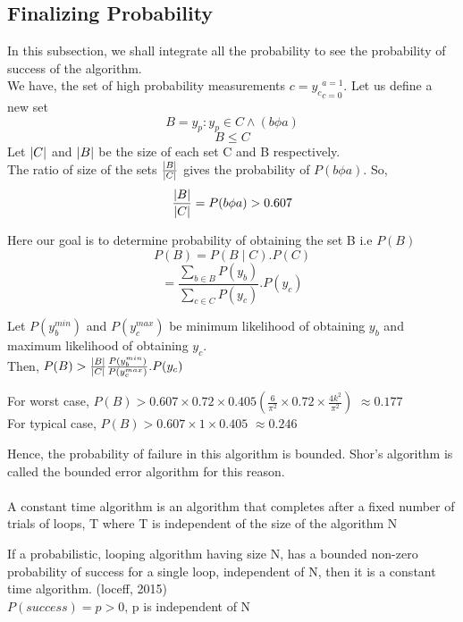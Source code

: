 \subsection{Finalizing Probability}
In this subsection, we shall integrate all the probability to see the probability of success of the algorithm. 
\\We have, the set of high probability measurements $c={y_c}_{c=0}^{a=1}$. Let us define a new set
$$B= {y_p : y_p \in C \wedge (b \phi a)  }$$
$$B \leq C$$
Let $\abs{C}$ and $\abs{B}$ be the size of each set C and B respectively.
\\The ratio of size of the sets $\frac{\abs{B}}{\abs{C}}$ gives the probability of $P(b \phi a)$.
So, $$ \frac{\abs{B}}{\abs{C}} = P(b \phi a) > 0.607$$

Here our goal is to determine probability of obtaining the set B i.e $P(B)$
$$P(B) = P(B \mid C) . P(C)$$
$$= \frac{\sum_{b \in B} P(y_b)}{\sum_{c \in C} P(y_c)} . P(y_c)$$

Let $P(y_b^{min})$ and $P(y_c^{max})$ be minimum likelihood of obtaining $y_b$ and maximum likelihood of obtaining $y_c$. 
\\Then, $P(B) > \frac{\abs{B}}{\abs{C}} \frac{P(y_b^{min})}{P(y_c^{max})} . P(y_c)$

For worst case, $P(B) > 0.607 \times 0.72 \times 0.405 (\frac{6}{\pi^2} \times 0.72 \times \frac{4k^2}{\pi^2})$
$\approx 0.177$
\\For typical case, $P(B) > 0.607 \times 1 \times 0.405$
$\approx 0.246$

Hence, the probability of failure in this algorithm is bounded. Shor's algorithm is called the bounded error algorithm for this reason.

\paragraph{}
A constant time algorithm is an algorithm that completes after a fixed number of trials of loops, T where T is independent of the size of the algorithm N

\begin{theorem}
    If a probabilistic, looping algorithm having size N, has a bounded non-zero probability of success for a single loop, independent of N, then it is a constant time algorithm. \cite{loceff2015}(loceff, 2015)
    \\$P(success) = p>0$, p is independent of N
    \label{th: Constant_Time_Complexity_theorem}
\end{theorem}

